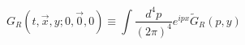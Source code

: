 \begin{equation}
\label{rev2}
G_R(t, \vec{x}, y; 0, \vec{0}, 0) \equiv \int \frac{d^4 p}{(2 \pi)^4}
e^{i p x} \tilde{G}_R(p, y)
\end{equation}

